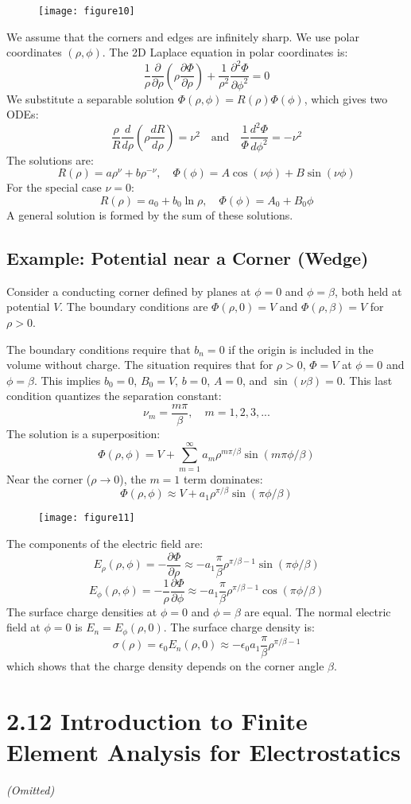 \documentclass{article}
\begin{document}
	\begin{figure}[h]
		\centering
		\texttt{[image: figure10]}
		\caption{}
		\label{fig:figure10}
	\end{figure}
	
	
	We assume that the corners and edges are infinitely sharp. We use polar coordinates \((\rho, \phi)\).
	The 2D Laplace equation in polar coordinates is:
	\[
	\frac{1}{\rho}\frac{\partial}{\partial \rho}\left(\rho \frac{\partial \Phi}{\partial \rho}\right) + \frac{1}{\rho^2}\frac{\partial^2 \Phi}{\partial \phi^2} = 0
	\]
	We substitute a separable solution \(\Phi(\rho, \phi) = R(\rho)\Phi(\phi)\), which gives two ODEs:
	\[
	\frac{\rho}{R} \frac{d}{d\rho}\left(\rho \frac{dR}{d\rho}\right) = \nu^2 \quad \text{and} \quad \frac{1}{\Phi}\frac{d^2\Phi}{d\phi^2} = -\nu^2
	\]
	The solutions are:
	\[
	R(\rho) = a\rho^{\nu} + b\rho^{-\nu}, \quad \Phi(\phi) = A\cos(\nu\phi) + B\sin(\nu\phi)
	\]
	For the special case \(\nu=0\):
	\[
	R(\rho) = a_0 + b_0 \ln\rho, \quad \Phi(\phi) = A_0 + B_0 \phi
	\]
	A general solution is formed by the sum of these solutions.
	
	\subsection*{Example: Potential near a Corner (Wedge)}
	Consider a conducting corner defined by planes at \(\phi=0\) and \(\phi=\beta\), both held at potential \(V\). The boundary conditions are \(\Phi(\rho, 0) = V\) and \(\Phi(\rho, \beta) = V\) for \(\rho>0\).
	
	The boundary conditions require that \(b_n=0\) if the origin is included in the volume without charge. The situation requires that for \(\rho>0\), \(\Phi=V\) at \(\phi=0\) and \(\phi=\beta\).
	This implies \(b_0=0\), \(B_0 = V\), \(b=0\), \(A=0\), and \(\sin(\nu\beta)=0\).
	This last condition quantizes the separation constant:
	\[
	\nu_m = \frac{m\pi}{\beta}, \quad m=1, 2, 3, ...
	\]
	The solution is a superposition:
	\[
	\Phi(\rho, \phi) = V + \sum_{m=1}^{\infty} a_m \rho^{m\pi/\beta} \sin(m\pi\phi/\beta)
	\]
	Near the corner (\(\rho \to 0\)), the \(m=1\) term dominates:
	\[
	\Phi(\rho, \phi) \approx V + a_1 \rho^{\pi/\beta} \sin(\pi\phi/\beta)
	\]
	
	\begin{figure}[h]
		\centering
		\texttt{[image: figure11]}
		\caption{}
		\label{fig:figure11}
	\end{figure}
	
	The components of the electric field are:
	\[
	E_\rho(\rho, \phi) = -\frac{\partial\Phi}{\partial\rho} \approx -a_1 \frac{\pi}{\beta} \rho^{\pi/\beta-1} \sin(\pi\phi/\beta)
	\]
	\[
	E_\phi(\rho, \phi) = -\frac{1}{\rho}\frac{\partial\Phi}{\partial\phi} \approx -a_1 \frac{\pi}{\beta} \rho^{\pi/\beta-1} \cos(\pi\phi/\beta)
	\]
	The surface charge densities at \(\phi=0\) and \(\phi=\beta\) are equal. The normal electric field at \(\phi=0\) is \(E_n = E_\phi(\rho, 0)\). The surface charge density is:
	\[
	\sigma(\rho) = \epsilon_0 E_n(\rho, 0) \approx -\epsilon_0 a_1 \frac{\pi}{\beta} \rho^{\pi/\beta-1}
	\]
	which shows that the charge density depends on the corner angle \(\beta\).
	
	
	
	
	

	\section*{2.12 Introduction to Finite Element Analysis for Electrostatics}
	\textit{(Omitted)}
	
\end{document}
